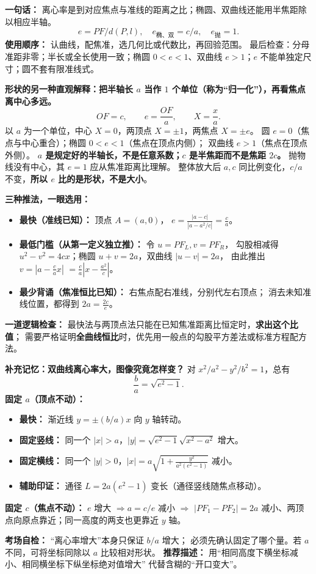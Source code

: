 \clearpage
\begin{summarybox}
\textbf{一句话：} 离心率是到对应焦点与准线的距离之比；椭圆、双曲线还能用半焦距除以相应半轴。
\[
 e=PF/d(P,l),\quad e_{\text{椭、双}}=c/a,\quad e_{\text{抛}}=1.
\]
\textbf{使用顺序：} 认曲线，配焦准，选几何比或代数比，再回验范围。
最后检查：分母准距非零；半长或全长使用一致；椭圆 $0<e<1$、双曲线 $e>1$；$e$ 不能单独定尺寸；圆不套有限准线式。

\medskip
\textbf{形状的另一种直观解释：把半轴长 $a$ 当作 $1$ 个单位（称为“归一化”），再看焦点离中心多远。}
\[
 \boxed{OF=c,\qquad e=\frac{OF}{a}},
 \qquad X=\frac xa.
\]
以 $a$ 为一个单位，中心 $X=0$，两顶点 $X=\pm1$，两焦点 $X=\pm e$。
圆 $e=0$（焦点与中心重合）；椭圆 $0<e<1$（焦点在顶点内侧）；
双曲线 $e>1$（焦点在顶点外侧）。
\textbf{$a$ 是规定好的半轴长，不是任意系数；$c$ 是半焦距而不是焦距 $2c$。}
抛物线没有中心，其 $e=1$ 应从焦准距离比理解。
整体放大后 $a,c$ 同比例变化，$c/a$ 不变，\textbf{所以 $e$ 比的是形状，不是大小}。



\medskip
\textbf{三种推法，一眼选用：}
\begin{itemize}
 \item \textbf{最快（准线已知）：} 顶点 $A=(a,0)$，
 $\displaystyle e=\frac{|a-c|}{|a-a^2/c|}=\frac ca$。
 \item \textbf{最低门槛（从第一定义独立推）：} 令 $u=PF_L,v=PF_R$，
 勾股相减得 $u^2-v^2=4cx$；椭圆 $u+v=2a$，双曲线 $|u-v|=2a$，
 由此推出 $\displaystyle v=\left|a-\frac ca x\right|$
 $=\displaystyle\frac ca\left|x-\frac{a^2}{c}\right|$。
 \item \textbf{最少背诵（焦准恒比已知）：} 右焦点配右准线，分别代左右顶点；
 消去未知准线位置，都得到 $\displaystyle 2a=\frac{2c}{e}$。
\end{itemize}
\textbf{一道逻辑检查：} 最快法与两顶点法只能在已知焦准距离比恒定时，\textbf{求出这个比值}；
需要严格证明\textbf{全曲线恒比}时，优先用一般点的勾股平方差法或标准方程配方法。


\medskip
\textbf{补充记忆：双曲线离心率大，图像究竟怎样变？}
对 $x^2/a^2-y^2/b^2=1$，总有
\[
 \boxed{\frac ba=\sqrt{e^2-1}}.
\]
\textbf{固定 $a$（顶点不动）：}
\begin{itemize}
 \item \textbf{最快：} 渐近线 $y=\pm(b/a)x$ 向 $y$ 轴转动。
 \item \textbf{固定竖线：} 同一个 $|x|>a$，$\displaystyle |y|=\sqrt{e^2-1}\sqrt{x^2-a^2}$ 增大。
 \item \textbf{固定横线：} 同一个 $|y|>0$，$\displaystyle |x|=a\sqrt{1+\frac{y^2}{a^2(e^2-1)}}$ 减小。
 \item \textbf{辅助印证：} 通径 $\displaystyle L=2a(e^2-1)$ 变长（通径竖线随焦点移动）。
\end{itemize}
\textbf{固定 $c$（焦点不动）：}
$e$ 增大 $\Rightarrow a=c/e$ 减小 $\Rightarrow$
$|PF_1-PF_2|=2a$ 减小、两顶点向原点靠近；同一高度的两支也更靠近 $y$ 轴。

\textbf{考场自检：} “离心率增大”本身只保证 $b/a$ 增大；
必须先确认固定了哪个量。若 $a$ 不同，可将坐标同除以 $a$ 比较相对形状。
\textbf{推荐描述：} 用“相同高度下横坐标减小、相同横坐标下纵坐标绝对值增大”
代替含糊的“开口变大”。

\end{summarybox}
